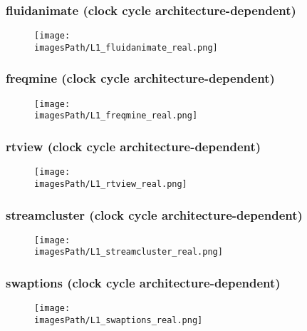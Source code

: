 \documentclass[12pt,a4paper]{article}
\newcommand{\imagesPath}{parsec-3.0/parsec_workspace/graphs}
\begin{document}
			\subsubsection{fluidanimate (clock cycle architecture-dependent)}
				\begin{figure}[H]
					\begin{center}
						\texttt{[image: \\imagesPath/L1\_fluidanimate\_real.png]}
					\end{center}
				\end{figure}
						
			\subsubsection{freqmine (clock cycle architecture-dependent)}
				\begin{figure}[H]
					\begin{center}
						\texttt{[image: \\imagesPath/L1\_freqmine\_real.png]}
					\end{center}
				\end{figure}
						
			\subsubsection{rtview (clock cycle architecture-dependent)}
				\begin{figure}[H]
					\begin{center}
						\texttt{[image: \\imagesPath/L1\_rtview\_real.png]}
					\end{center}
				\end{figure}
			
			\subsubsection{streamcluster (clock cycle architecture-dependent)}
				\begin{figure}[H]
					\begin{center}
						\texttt{[image: \\imagesPath/L1\_streamcluster\_real.png]}
					\end{center}
				\end{figure}
						
			\subsubsection{swaptions (clock cycle architecture-dependent)}
				\begin{figure}[H]
					\begin{center}
						\texttt{[image: \\imagesPath/L1\_swaptions\_real.png]}
					\end{center}
				\end{figure}
						
\end{document}
